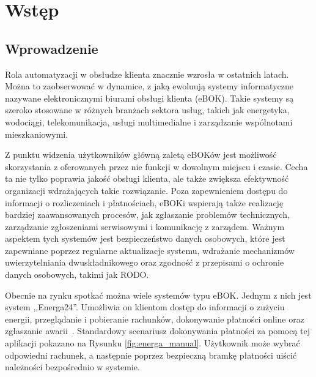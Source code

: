 \chapter{Wstęp}
\section{Wprowadzenie}
Rola automatyzacji w obsłudze klienta znacznie wzrosła w ostatnich latach. Można to zaobserwować w dynamice, z jaką ewoluują systemy informatyczne nazywane elektronicznymi biurami obsługi klienta (eBOK). Takie systemy są szeroko stosowane w różnych branżach sektora usług, takich jak energetyka, wodociągi, telekomunikacja, usługi multimedialne i zarządzanie wspólnotami mieszkaniowymi.

Z punktu widzenia użytkowników główną zaletą eBOKów jest możliwość skorzystania z oferowanych przez nie funkcji w dowolnym miejscu i czasie. Cecha ta nie tylko poprawia jakość obsługi klienta, ale także zwiększa efektywność organizacji wdrażających takie rozwiązanie. Poza zapewnieniem dostępu do informacji o rozliczeniach i płatnościach, eBOKi wspierają także realizację bardziej zaawansowanych procesów, jak zgłaszanie problemów technicznych, zarządzanie zgłoszeniami serwisowymi i komunikację z zarządem. Ważnym aspektem tych systemów jest bezpieczeństwo danych osobowych, które jest zapewniane poprzez regularne aktualizacje systemu, wdrażanie mechanizmów uwierzytelniania dwuskładnikowego oraz zgodność z przepisami o ochronie danych osobowych, takimi jak RODO.

Obecnie na rynku spotkać można wiele systemów typu eBOK. Jednym z nich jest system ,,Energa24''. Umożliwia on klientom dostęp do informacji o zużyciu energii, przeglądanie i pobieranie rachunków, dokonywanie płatności online oraz zgłaszanie awarii~\cite{energa}. Standardowy scenariusz dokonywania płatności za pomocą tej aplikacji pokazano na Rysunku \ref{fig:energa_manual}. Użytkownik może wybrać odpowiedni rachunek, a następnie poprzez bezpieczną bramkę płatności uiścić należności bezpośrednio w systemie.

